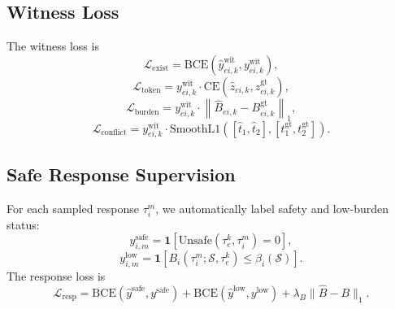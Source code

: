 \documentclass[10pt]{article}
\begin{document}
\subsection{Witness Loss}
\label{app:witness_loss}

The witness loss is
\begin{equation}
    \mathcal{L}_{\mathrm{exist}}
    =
    \mathrm{BCE}
    (
    \widehat{y}^{\mathrm{wit}}_{ei,k},
    y^{\mathrm{wit}}_{ei,k}
    ),
\end{equation}
\begin{equation}
    \mathcal{L}_{\mathrm{token}}
    =
    y^{\mathrm{wit}}_{ei,k}
    \cdot
    \mathrm{CE}
    (
    \widehat{z}_{ei,k},
    z^{\mathrm{gt}}_{ei,k}
    ),
\end{equation}
\begin{equation}
    \mathcal{L}_{\mathrm{burden}}
    =
    y^{\mathrm{wit}}_{ei,k}
    \cdot
    \left\|
    \widehat{B}_{ei,k}
    -
    B^{\mathrm{gt}}_{ei,k}
    \right\|_1,
\end{equation}
\begin{equation}
    \mathcal{L}_{\mathrm{conflict}}
    =
    y^{\mathrm{wit}}_{ei,k}
    \cdot
    \mathrm{SmoothL1}
    \left(
    [\widehat{t}_1,\widehat{t}_2],
    [t^{\mathrm{gt}}_1,t^{\mathrm{gt}}_2]
    \right).
\end{equation}

\subsection{Safe Response Supervision}
\label{app:response_loss}

For each sampled response $\tau_i^m$, we automatically label safety and low-burden status:
\begin{equation}
    y^{\mathrm{safe}}_{i,m}
    =
    \mathbf{1}
    [
    \mathrm{Unsafe}(\tau^k_e,\tau_i^m)=0
    ],
\end{equation}
\begin{equation}
    y^{\mathrm{low}}_{i,m}
    =
    \mathbf{1}
    [
    B_i(\tau_i^m;\mathcal{S},\tau^k_e)
    \le
    \beta_i(\mathcal{S})
    ].
\end{equation}
The response loss is
\begin{equation}
    \mathcal{L}_{\mathrm{resp}}
    =
    \mathrm{BCE}(\widehat{y}^{\mathrm{safe}},y^{\mathrm{safe}})
    +
    \mathrm{BCE}(\widehat{y}^{\mathrm{low}},y^{\mathrm{low}})
    +
    \lambda_B
    \|\widehat{B}-B\|_1 .
\end{equation}
\end{document}
